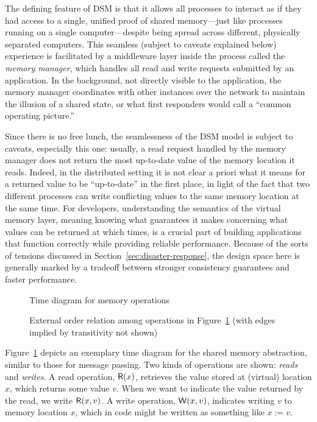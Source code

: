 \documentclass[]             %
{NASA}                       %
\theoremstyle{definition}
\begin{document}
The defining feature of DSM is that it allows all processes to
interact as if they had access to a single, unified proof of shared
memory---just like processes running on a single computer---despite
being spread across different, physically separated computers.  This
seamless (subject to caveats explained below) experience is
facilitated by a middleware layer inside the process called the
\emph{memory manager}, which handles all read and write requests
submitted by an application. In the background, not directly visible
to the application, the memory manager coordinates with other
instances over the network to maintain the illusion of a shared state,
or what first responders would call a ``common operating picture.''

Since there is no free lunch, the seamlessness of the DSM model is
subject to caveats, especially this one: usually, a read request
handled by the memory manager does not return the most up-to-date
value of the memory location it reads. Indeed, in the distributed
setting it is not clear a priori what it means for a returned value to
be ``up-to-date'' in the first place, in light of the fact that two
different processes can write conflicting values to the same memory
location at the same time. For developers, understanding the semantics
of the virtual memory layer, meaning knowing what guarantees it makes
concerning what values can be returned at which times, is a crucial
part of building applications that function correctly while providing
reliable performance. Because of the sorts of tensions discussed in
Section~\ref{sec:disaster-response}, the design space here is
generally marked by a tradeoff between stronger consistency guarantees
and faster performance.

\begin{figure}
    \centering
    
    \caption{Time diagram for memory operations}
    \label{fig:dsm-example-1}
\end{figure}

\begin{figure}
  \centering
  
  \caption{External order relation among operations in Figure~\ref{fig:dsm-example-1} (with edges implied by transitivity not shown)}
  \label{fig:dsm-example-1-DAG}
\end{figure}

Figure~\ref{fig:dsm-example-1} depicts an exemplary time diagram for
the shared memory abstraction, similar to those for message
passing. Two kinds of operations are shown: \emph{reads} and
\emph{writes}. A read operation, $\mathsf{R}\!\left(x\right)$, retrieves the value
stored at (virtual) location $x$, which returns some value $v$. When
we want to indicate the value returned by the read, we write
$\mathsf{R}\!\left(x, v\right)$. A write operation, $\mathsf{W}\!\left(x, v\right)$, indicates
writing $v$ to memory location $x$, which in code might be written as
something like $x := v$.
\end{document}
